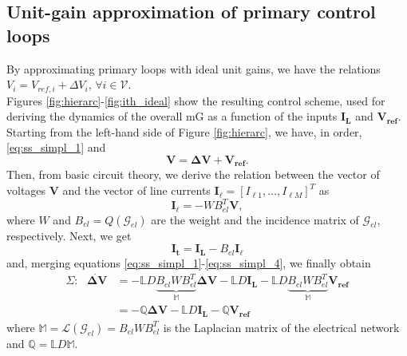 \documentclass[a4paper]{article}
\theoremstyle{plain}
\begin{document}
\subsection{Unit-gain approximation of primary control loops}
\label{sec:simpl_model}
By approximating primary
loops with ideal unit gains, we have the relations $V_{i} =V_{ref,i}+\Delta V_{i}$,
$\forall i\in\mathcal{V}$. \\
Figures \ref{fig:hierarc}-\ref{fig:ith_ideal} show the resulting control scheme, used for deriving the dynamics of the overall mG as a function of the inputs $\mathbf{I_{L}} $ and
$\mathbf{V_{ref}}$. Starting from
the left-hand side of Figure \ref{fig:hierarc}, we have, in order, \eqref{eq:ss_simpl_1} and 
\begin{equation}
\label{eq:ss_simpl_2}
\mathbf{V} = \mathbf{\Delta V} + \mathbf{V_{ref}}.
\end{equation}
Then, from basic circuit theory, we derive the relation between the vector of voltages $\mathbf{V}$ and the vector of line currents $\mathbf{I_{\ell}} =  [I_{\ell1}, \dots,I_{\ell M}]^{T}$ as
\begin{equation}
\label{eq:ss_simpl_3}
\mathbf{I_{\ell}} = -WB_{el}^{T}\mathbf{V},
\end{equation}  
where $W$ and $B_{el}=Q(\mathcal{G}_{el})$ are the weight and the incidence matrix of $\mathcal{G}_{el}$, respectively. Next, we get
\begin{equation}
\label{eq:ss_simpl_4}
\mathbf{ I_{t}} = \mathbf{I_{L}} - B_{el}\mathbf{I_{\ell}}
\end{equation} 
and, merging equations \eqref{eq:ss_simpl_1}-\eqref{eq:ss_simpl_4}, we finally obtain
\begin{equation}
\label{eq:ss_simpl_dyn}
\begin{aligned}
\Sigma:\text{ } \mathbf{ \dot{\Delta V}} &= -\mathbb{L}D\underbrace{B_{el}W B_{el}^{T}}_{\mathbb M}\mathbf{\Delta V}-\mathbb{L}D\mathbf{I_{L}}-\mathbb{L} D\underbrace{B_{el}WB_{el}^{T}}_{\mathbb M}\mathbf{V_{ref}}\\
&= -\mathbb{Q}\mathbf{\Delta V}-\mathbb{L} D\mathbf{I_{L}}-\mathbb{Q}\mathbf{V_{ref}}
\end{aligned}
\end{equation} 
where $\mathbb M=\mathcal L(\mathcal{G}_{el}) = B_{el} W B_{el}^{T}$ is the
Laplacian matrix of the electrical network and $\mathbb{Q} =
\mathbb{L}D\mathbb{M}$. 
\end{document}
